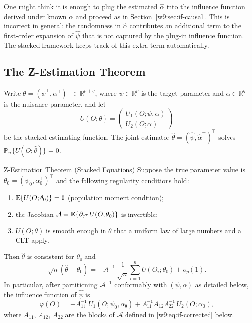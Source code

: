 \documentclass[master.tex]{subfiles}
\begin{document}
\begin{remark}
\label{w9:rem:why-stack}
One might think it is enough to plug the estimated $\hat\alpha$ into
the influence function derived under known $\alpha$ and proceed as in
Section~\ref{w9:sec:if-causal}.  This is incorrect in general: the
randomness in $\hat\alpha$ contributes an additional term to the
first-order expansion of $\hat\psi$ that is not captured by the
plug-in influence function.  The stacked framework keeps track of this
extra term automatically.
\end{remark}

\subsection{The Z-Estimation Theorem}
\label{w9:subsec:zthm}

Write $\theta = (\psi^\top, \alpha^\top)^\top \in \mathbb{R}^{p+q}$,
where $\psi \in \mathbb{R}^p$ is the target parameter and
$\alpha \in \mathbb{R}^q$ is the nuisance parameter, and let
\[
  U(O;\theta)
  =
  \begin{pmatrix} U_1(O;\psi,\alpha) \\ U_2(O;\alpha) \end{pmatrix}
\]
be the stacked estimating function.  The joint estimator
$\hat\theta = (\hat\psi, \hat\alpha^\top)^\top$ solves
$\mathbb{P}_n\{U(O;\hat\theta)\} = 0$.

\begin{thm}{Z-Estimation Theorem (Stacked Equations)}
\label{w9:thm:zest}
Suppose the true parameter value is $\theta_0 = (\psi_0,\alpha_0^\top)^\top$
and the following regularity conditions hold:
\begin{enumerate}[label=(\roman*)]
  \item $\mathbb{E}\{U(O;\theta_0)\}=0$ (population moment condition);
  \item the Jacobian
    $\mathcal{A} = \mathbb{E}\{\partial_{\theta^\top} U(O;\theta_0)\}$ is
    invertible;
  \item $U(O;\theta)$ is smooth enough in $\theta$ that a
    uniform law of large numbers and a CLT apply.
\end{enumerate}
Then $\hat\theta$ is consistent for $\theta_0$ and
\[
  \sqrt{n}(\hat\theta - \theta_0)
  =
  -\mathcal{A}^{-1}\,
  \frac{1}{\sqrt{n}}\sum_{i=1}^n U(O_i;\theta_0)
  + o_p(1).
\]
In particular, after partitioning $\mathcal{A}^{-1}$ conformably with
$(\psi,\alpha)$ as detailed below, the influence function of $\hat\psi$
is
\[
  \varphi(O)
  =
  -A_{11}^{-1}\,U_1(O;\psi_0,\alpha_0)
  + A_{11}^{-1}A_{12}A_{22}^{-1}\,U_2(O;\alpha_0),
\]
where $A_{11}$, $A_{12}$, $A_{22}$ are the blocks of $\mathcal{A}$
defined in \eqref{w9:eq:if-corrected} below.
\end{thm}
\end{document}
